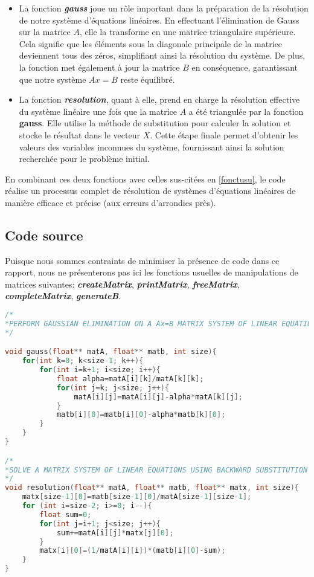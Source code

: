\begin{itemize}
\item La fonction \textit{\textbf{gauss}} joue un rôle important dans la préparation de la résolution de notre système d'équations linéaires. En effectuant l'élimination de Gauss sur la matrice $A$, elle la transforme en une matrice triangulaire supérieure. Cela signifie que les éléments sous la diagonale principale de la matrice deviennent tous des zéros, simplifiant ainsi la résolution du système. De plus, la fonction met également à jour la matrice $B$ en conséquence, garantissant que notre système $Ax=B$ reste équilibré.\\

\item La fonction \textit{\textbf{resolution}}, quant à elle, prend en charge la résolution effective du système linéaire une fois que la matrice $A$ a été triangulée par la fonction \textbf{gauss}. Elle utilise la méthode de substitution pour calculer la solution et stocke le résultat dans le vecteur $X$. Cette étape finale permet d'obtenir les valeurs des variables inconnues du système, fournissant ainsi la solution recherchée pour le problème initial.\\
\end{itemize}


En combinant ces deux fonctions avec celles sus-citées en \ref{fonctusu}, le code réalise un processus complet de résolution de systèmes d'équations linéaires de manière efficace et précise (aux erreurs d'arrondies près).\\
\subsection{Code source}
Puisque nous sommes contraints de minimiser la présence de code dans ce rapport, nous ne présenterons pas ici les fonctions usuelles de manipulations de matrices suivantes: \textit{\textbf{createMatrix}},  \textit{\textbf{printMatrix}},  \textit{\textbf{freeMatrix}},  \textit{\textbf{completeMatrix}},  \textit{\textbf{generateB}}.\\

\begin{lstlisting}[language=C,inputencoding=utf8, basicstyle=\fontsize{8}{10}\selectfont]
/*
*PERFORM GAUSSIAN ELIMINATION ON A Ax=B MATRIX SYSTEM OF LINEAR EQUATIONS
*/

void gauss(float** matA, float** matb, int size){
	for(int k=0; k<size-1; k++){
		for(int i=k+1; i<size; i++){
			float alpha=matA[i][k]/matA[k][k];
			for(int j=k; j<size; j++){
				matA[i][j]=matA[i][j]-alpha*matA[k][j];
			}
			matb[i][0]=matb[i][0]-alpha*matb[k][0];
		}
	}
}

/*
*SOLVE A MATRIX SYSTEM OF LINEAR EQUATIONS USING BACKWARD SUBSTITUTION
*/
void resolution(float** matA, float** matb, float** matx, int size){
	matx[size-1][0]=matb[size-1][0]/matA[size-1][size-1];
	for (int i=size-2; i>=0; i--){
		float sum=0;
		for(int j=i+1; j<size; j++){
			sum+=matA[i][j]*matx[j][0];
		}
		matx[i][0]=(1/matA[i][i])*(matb[i][0]-sum);
	}
}
\end{lstlisting}

